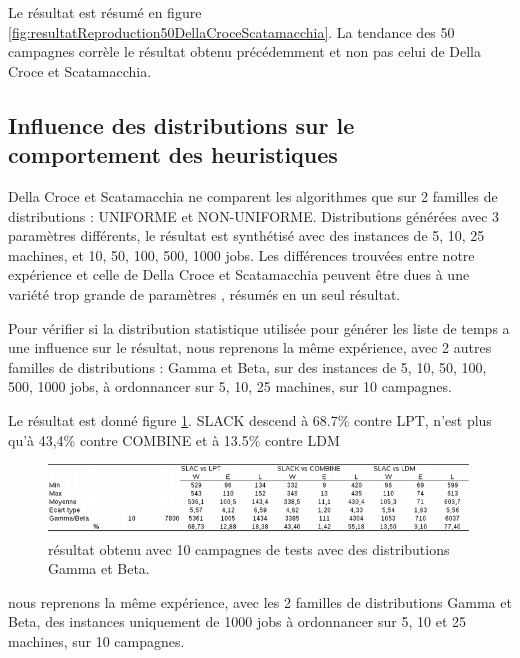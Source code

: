 \documentclass[a4paper,12pt]{report}
\theoremstyle{plain}				%
\theoremstyle{definition}				%
\begin{document}
Le résultat est résumé en figure \ref{fig:resultatReproduction50DellaCroceScatamacchia}. 
La tendance des 50 campagnes corrèle le résultat obtenu précédemment et non pas 
  celui de Della Croce et Scatamacchia.

\subsection{Influence des distributions sur le comportement des heuristiques}
\label{ssec:resultatsInfluenceDesDistributionSurLeComportement}


Della Croce et Scatamacchia ne comparent les algorithmes que sur 2 familles de distributions : 
UNIFORME et NON-UNIFORME. Distributions générées avec 3 paramètres différents, le résultat est synthétisé avec des instances de 5, 10, 25 machines, et 10, 50, 100, 500, 1000 jobs. 
Les différences trouvées entre notre expérience et celle de Della Croce et Scatamacchia peuvent 
être dues à une variété trop grande de paramètres , résumés en un seul résultat.

\bigskip
Pour vérifier si la distribution statistique utilisée pour générer les liste de temps 
  a une influence sur le résultat, 
  nous reprenons la même expérience, avec 2 autres familles de distributions : 
  Gamma et Beta,
  sur des instances de 5, 10, 50, 100, 500, 1000 jobs, 
  à ordonnancer sur 5, 10, 25 machines,
  sur 10 campagnes.

Le résultat est donné figure \ref{fig:resultatReproduction10GammaBeta}.
SLACK descend à 68.7\% contre LPT, 
n'est plus qu'à 43,4\% contre COMBINE et
à 13.5\% contre LDM
   
\begin{figure}
{\centering
\includegraphics[width=\columnwidth]{5_Resultat_Reproduction10GammaBeta.png}
\caption{résultat obtenu avec 10 campagnes de tests avec des distributions Gamma et Beta.}
\label{fig:resultatReproduction10GammaBeta}
\par}
\end{figure}

\bigskip
nous reprenons la même expérience, avec les 2 familles de distributions Gamma et Beta, 
  des instances uniquement de 1000 jobs à ordonnancer sur 5, 10 et 25 machines,
  sur 10 campagnes.
\end{document}
